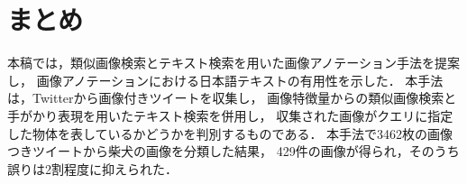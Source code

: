 \chapter{まとめ}
\label{sec:format}
本稿では，類似画像検索とテキスト検索を用いた画像アノテーション手法を提案し，
画像アノテーションにおける日本語テキストの有用性を示した．
本手法は，Twitterから画像付きツイートを収集し，
画像特徴量からの類似画像検索と手がかり表現を用いたテキスト検索を併用し，
収集された画像がクエリに指定した物体を表しているかどうかを判別するものである．
本手法で3462枚の画像つきツイートから柴犬の画像を分類した結果，
429件の画像が得られ，そのうち誤りは2割程度に抑えられた．